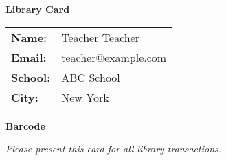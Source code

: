 \documentclass{article}
\begin{document}
\begin{center}
    \Huge \textbf{Library Card}
\end{center}

\begin{tabular}{ll}
    \textbf{Name:} & Teacher Teacher \\
    \textbf{Email:} & teacher@example.com \\
    \textbf{School:} & ABC School \\
    \textbf{City:} & New York \\
\end{tabular}


\begin{center}
    \textbf{Barcode}
    
\end{center}

\begin{center}
    \textit{Please present this card for all library transactions.}
\end{center}
\end{document}
